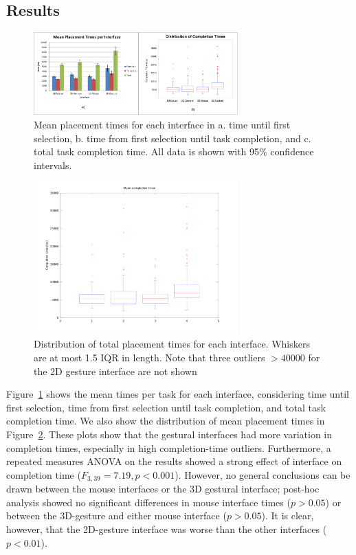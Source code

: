 \documentclass[pageno]{jpaper}
\begin{document}
\subsection{Results}
\begin{figure}
\centering
\includegraphics[width=0.7\textwidth]{figures/aggmean.png}
\caption{Mean placement times for each interface in a. time until first
selection, b. time from first selection until task completion, and c. total task
completion time. All data is shown with 95\% confidence intervals.}
\label{fig:aggregate}
\end{figure}
\begin{figure}
\centering
\includegraphics[width=0.7\textwidth]{figures/distribution.png}
\caption{Distribution of total placement times for each interface. Whiskers are
 at most 1.5 IQR in length. Note that three outliers $> 40000$ for the 2D gesture interface are not
shown}
\label{fig:distr}
\end{figure}
Figure~\ref{fig:aggregate} shows the mean times per task for each interface, considering time until first selection, time from first selection until
task completion, and total task completion time. We also show the distribution
of mean placement times in Figure~\ref{fig:distr}. These plots show that the gestural interfaces had more variation in completion times, especially in high completion-time
outliers. Furthermore, a repeated measures ANOVA on the results showed a strong effect of
interface on completion time ($F_{3,39}=7.19, p < 0.001$).
However, no general conclusions can be drawn between the mouse interfaces or the 3D gestural interface; post-hoc analysis showed no significant differences
in mouse interface times ($p > 0.05$) or between the 3D-gesture and either mouse interface ($p > 0.05$). It is clear, however, that the 2D-gesture interface
was worse than the other interfaces ($p < 0.01$).
\end{document}

